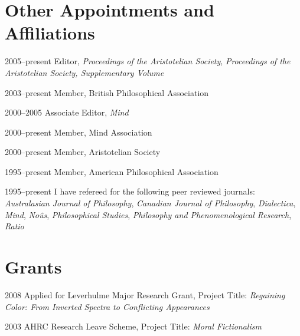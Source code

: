 \documentclass[contbibnum]{cv}
\begin{document}
\section{Other Appointments and Affiliations} %
\label{sec:other_appointments_and_affiliations}
\begin{topic}
	\item[2005--present] Editor, \emph{Proceedings of the Aristotelian Society}, \emph{Proceedings of the Aristotelian Society, Supplementary Volume}
	\item[2003--present] Member, British Philosophical Association
	\item[2000--2005] Associate Editor, \emph{Mind}
	\item[2000--present] Member, Mind Association
	\item[2000--present] Member, Aristotelian Society
	\item[1995--present] Member, American Philosophical Association
	\item[1995--present] I have refereed for the following peer reviewed journals: \emph{Australasian Journal of Philosophy}, \emph{Canadian Journal of Philosophy}, \emph{Dialectica}, \emph{Mind}, \emph{Noûs}, \emph{Philosophical Studies}, \emph{Philosophy and Phenomenological Research}, \emph{Ratio} 
\end{topic}

\section{Grants} %
\label{sec:grants}
\begin{topic}
	\item[2008] Applied for Leverhulme Major Research Grant, Project Title: \emph{Regaining Color: From Inverted Spectra to Conflicting Appearances}
	\item[2003] AHRC Research Leave Scheme, Project Title: \emph{Moral Fictionalism}
\end{topic}
\end{document}
